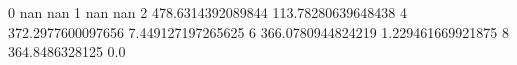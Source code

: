 0 nan nan
1 nan nan
2 478.6314392089844 113.78280639648438
4 372.2977600097656 7.449127197265625
6 366.0780944824219 1.229461669921875
8 364.8486328125 0.0
